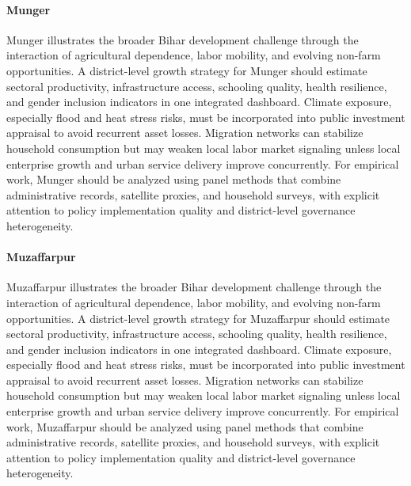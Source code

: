 \documentclass[preprint,12pt]{elsarticle}
\begin{document}
\paragraph{Munger} Munger illustrates the broader Bihar development challenge through the interaction of agricultural dependence, labor mobility, and evolving non-farm opportunities. A district-level growth strategy for Munger should estimate sectoral productivity, infrastructure access, schooling quality, health resilience, and gender inclusion indicators in one integrated dashboard. Climate exposure, especially flood and heat stress risks, must be incorporated into public investment appraisal to avoid recurrent asset losses. Migration networks can stabilize household consumption but may weaken local labor market signaling unless local enterprise growth and urban service delivery improve concurrently. For empirical work, Munger should be analyzed using panel methods that combine administrative records, satellite proxies, and household surveys, with explicit attention to policy implementation quality and district-level governance heterogeneity.

\paragraph{Muzaffarpur} Muzaffarpur illustrates the broader Bihar development challenge through the interaction of agricultural dependence, labor mobility, and evolving non-farm opportunities. A district-level growth strategy for Muzaffarpur should estimate sectoral productivity, infrastructure access, schooling quality, health resilience, and gender inclusion indicators in one integrated dashboard. Climate exposure, especially flood and heat stress risks, must be incorporated into public investment appraisal to avoid recurrent asset losses. Migration networks can stabilize household consumption but may weaken local labor market signaling unless local enterprise growth and urban service delivery improve concurrently. For empirical work, Muzaffarpur should be analyzed using panel methods that combine administrative records, satellite proxies, and household surveys, with explicit attention to policy implementation quality and district-level governance heterogeneity.
\end{document}
